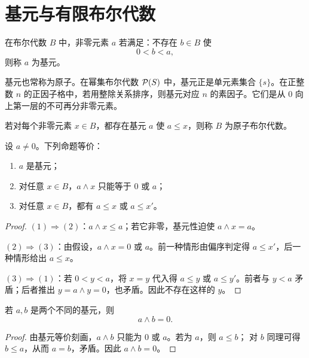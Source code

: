 \section{基元与有限布尔代数}

\begin{definition}[基元]\label{atom}
  在布尔代数 $B$ 中，非零元素 $a$ 若满足：不存在 $b\in B$ 使
  \[
  0<b<a,
  \]
  则称 $a$ 为基元。
\end{definition}

基元也常称为原子。在幂集布尔代数 $\mathcal P(S)$ 中，基元正是单元素集合 $\{s\}$。在正整数 $n$ 的正因子格中，若用整除关系排序，则基元对应 $n$ 的素因子。它们是从 $0$ 向上第一层的不可再分非零元素。

\begin{definition}[原子布尔代数]\label{atomic-boolean}
  若对每个非零元素 $x\in B$，都存在基元 $a$ 使 $a\le x$，则称 $B$ 为原子布尔代数。
\end{definition}

\begin{theorem}[基元的等价刻画]\label{atom-characterization}
  设 $a\ne0$。下列命题等价：
  \begin{enumerate}
    \item $a$ 是基元；
    \item 对任意 $x\in B$，$a\wedge x$ 只能等于 $0$ 或 $a$；
    \item 对任意 $x\in B$，都有 $a\le x$ 或 $a\le x'$。
  \end{enumerate}
\end{theorem}

\begin{proof}
  $(1)\Rightarrow(2)$：$a\wedge x\le a$；若它非零，基元性迫使
  $a\wedge x=a$。

  $(2)\Rightarrow(3)$：由假设，$a\wedge x=0$ 或 $a$。前一种情形由偏序判定得
  $a\le x'$，后一种情形给出 $a\le x$。

  $(3)\Rightarrow(1)$：若 $0<y<a$，将 $x=y$ 代入得 $a\le y$ 或
  $a\le y'$。前者与 $y<a$ 矛盾；后者推出
  $y=a\wedge y=0$，也矛盾。因此不存在这样的 $y$。
\end{proof}

\begin{theorem}[不同基元的交]\label{distinct-atoms-meet-zero}
  若 $a,b$ 是两个不同的基元，则
  \[
  a\wedge b=0.
  \]
\end{theorem}

\begin{proof}
  由基元等价刻画，$a\wedge b$ 只能为 $0$ 或 $a$。若为 $a$，则 $a\le b$；
  对 $b$ 同理可得 $b\le a$，从而 $a=b$，矛盾。因此 $a\wedge b=0$。
\end{proof}

